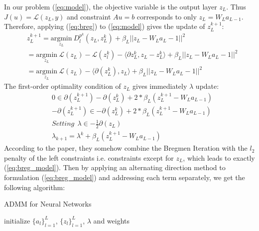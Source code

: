 \documentclass[letterpaper, 10 pt, conference]{ieeeconf}  %
\begin{document}
In our problem (\ref{eq:model}), the objective variable is the output layer $z_L$. Thus $J(u) = \mathcal{L}(z_L, y)$ and constraint $Au = b$ corresponds to only $z_L = W_La_{L-1}$. Therefore, applying (\ref{eq:breg}) to (\ref{eq:model}) gives the update of $z_L^{k+1}$:
\begin{equation*}
\begin{aligned}
&z_L^{k+1} = \underset{z_L}{\text{argmin}} \: D_l^{p^k}(z_L, z_L^k) + \beta_L||z_L - W_La_L-1||^2\\
&= \underset{z_L}{\text{argmin}} \: \mathcal{L}(z_L) -\mathcal{L}(z_l^k) 
 - \langle  \partial z_L^k, z_L - z_L^k \rangle +  \beta_L||z_L - W_La_L-1||^2\\
&= \underset{z_L}{\text{argmin}} \: \mathcal{L}(z_L) 
 - \langle \partial(z_L^k), z_L \rangle + \beta_L||z_L - W_La_L-1||^2
 \label{eq:zL}
\end{aligned} 
\end{equation*}
The first-order optimality condition of $z_L$ gives immediately $\lambda$ update:
\begin{equation*}
\begin{aligned}
&0 \in \partial(z_L^{k+1}) -  \partial(z_L^k) + 2 * \beta_L(z_L^{k+1} - W_La_{L-1}) \\
&- \partial(z_L^{k+1}) \in - \partial(z_L^k) +  2 * \beta_L(z_L^{k+1} - W_La_{L-1}) \\
&Setting \: \:  \lambda \in-  \frac{1}{2} \partial(z_L) \\
&\lambda_{k+1} = \lambda^k + \beta_L(z_L^{k+1} - W_La_{L-1})
\label{eq:zL}
\end{aligned} 
\end{equation*}
According to the paper, they somehow combine the Bregmen Iteration with the $l_2$ penalty of the left constraints i.e. constraints except for $z_L$, which leads to exactly (\ref{eq:breg_model}). Then by applying an alternating direction method to formulation (\ref{eq:breg_model}) and addressing each term separately, we get the following algorithm:
\begin{algorithm} 
\caption{ADMM for Neural Networks}
\label{alg:goldADMM}
initialize $\{a_l\}^{L}_{l=1}$, $\{z_l\}^{L}_{l=1}$, $\lambda$ and weights\\

\end{algorithm}
\end{document}
